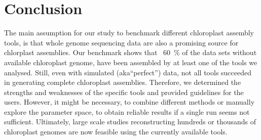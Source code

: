 \documentclass{bmcart}
\newcounter{todocounter}
\newcommand{\ff}[1]
{\stepcounter{todocounter}
 \todo[color=blue!40,author=For Frank]{\thetodocounter: #1}
 }
\begin{document}
\section*{Conclusion}
The main assumption for our study to benchmark different chloroplast assembly tools, is that whole genome sequencing data are also a promising source for chlorplast assemblies.
Our benchmark shows that ~\SI{60}{\percent} of the data sets without available chloroplast genome, have been assembled by at least one of the tools we analysed.
Still, even with simulated (aka``perfect'') data, not all tools succeeded in generating complete chloroplast assemblies.
Therefore, we determined the strengths and weaknesses of the specific tools and provided guidelines for the users.
However, it might be necessary, to combine different methods or manually explore the parameter space, to obtain reliable results if a single run seems not sufficient.
Ultimately, large scale studies reconstructing hundreds or thousands of chloroplast genomes are now feasible using the currently available tools. 

\end{document}
